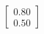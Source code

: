 \documentclass[preview]{standalone}
\begin{document}
\begin{align*}
\begin{bmatrix} 0.80 \\ 0.50 \end{bmatrix}
\end{align*}
\end{document}
